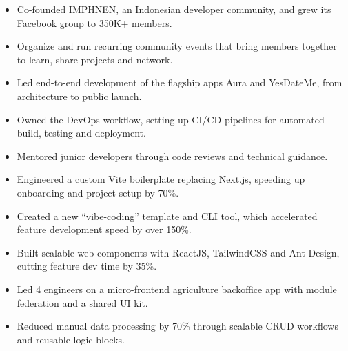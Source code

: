 \vspace{0.5em}
\begin{itemize}[leftmargin=*, topsep=0pt]
    \item Co-founded IMPHNEN, an Indonesian developer community, and grew its Facebook group to 350K+ members.
    \item Organize and run recurring community events that bring members together to learn, share projects and network.
\end{itemize}
\vspace{0.5em}
\begin{itemize}[leftmargin=*, topsep=0pt]
    \item Led end-to-end development of the flagship apps Aura and YesDateMe, from architecture to public launch.
    \item Owned the DevOps workflow, setting up CI/CD pipelines for automated build, testing and deployment.
    \item Mentored junior developers through code reviews and technical guidance.
\end{itemize}
\vspace{0.5em}
\begin{itemize}[leftmargin=*, topsep=0pt]
    \item Engineered a custom Vite boilerplate replacing Next.js, speeding up onboarding and project setup by 70\%.
    \item Created a new ``vibe-coding'' template and CLI tool, which accelerated feature development speed by over 150\%.
    \item Built scalable web components with ReactJS, TailwindCSS and Ant Design, cutting feature dev time by 35\%.
\end{itemize}
\vspace{0.5em}
\begin{itemize}[leftmargin=*, topsep=0pt]
    \item Led 4 engineers on a micro-frontend agriculture backoffice app with module federation and a shared UI kit.
    \item Reduced manual data processing by 70\% through scalable CRUD workflows and reusable logic blocks.
\end{itemize}
\vspace{0.5em}
